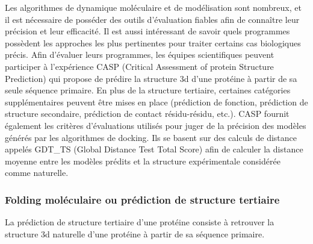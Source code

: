 Les algorithmes de dynamique moléculaire et de modélisation sont nombreux, et il est nécessaire de posséder des outils d'évaluation fiables afin de connaître leur précision et leur efficacité. Il est aussi intéressant de savoir quels programmes possèdent les approches les plus pertinentes pour traiter certains cas biologiques précis. Afin d'évaluer leurs programmes, les équipes scientifiques peuvent participer à l'expérience CASP (Critical Assessment of protein Structure Prediction) qui propose de prédire la structure 3d d'une protéine à partir de sa seule séquence primaire. En plus de la structure tertiaire, certaines catégories supplémentaires peuvent être mises en place (prédiction de fonction, prédiction de structure secondaire, prédiction de contact résidu-résidu, etc.). CASP fournit également les critères d'évaluations utilisés pour juger de la précision des modèles générés par les algorithmes de docking. Ils se basent sur des calculs de distance appelés GDT\_TS (Global Distance Test Total Score) afin de calculer la distance moyenne entre les modèles prédits et la structure expérimentale considérée comme naturelle. 




\subsubsection{Folding moléculaire ou prédiction de structure tertiaire} 

La prédiction de structure tertiaire d'une protéine consiste à retrouver la structure 3d naturelle d'une protéine à partir de sa séquence primaire. 

